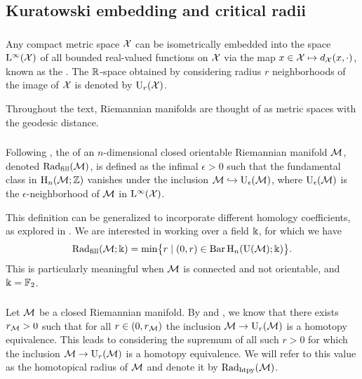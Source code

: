 
\subsection{Kuratowski embedding and critical radii}\label{sub:filling radii}

\subsubsection{}

Any compact metric space \(\cX\) can be isometrically embedded into the space \(\rL^\infty(\cX)\) of all bounded real-valued functions on \(\cX\) via the map \(x \in \cX \mapsto d_\cX(x,\cdot)\), known as the .
The \(\R\)-space obtained by considering radius \(r\) neighborhoods of the image of \(\cX\) is denoted by \(\rU_r(\cX)\).

Throughout the text, Riemannian manifolds are thought of as metric spaces with the geodesic distance.

\subsubsection{}

Following \cite{gromov1983filling}, the  of an \(n\)-dimensional closed orientable Riemannian manifold \(\cM\), denoted \(\fillrad(\cM)\), is defined as the infimal \(\epsilon > 0\) such that the fundamental class in \(\rH_n(\cM; \Z)\) vanishes under the inclusion \(\cM \hookrightarrow \rU_\epsilon(\cM)\), where \(\rU_\epsilon(\cM)\) is the \(\epsilon\)-neighborhood of \(\cM\) in \(\rL^\infty(\cX)\).

This definition can be generalized to incorporate different homology coefficients, as explored in \cite{lim2024vietoris}. 
We are interested in working over a field \(\k\), for which we have
\[
\fillrad(\cM; \field) = \min\set[\big]{r \mid (0, r) \in \barc \rH_n(\rU(\cM); \field)}.
\]
This is particularly meaningful when \(\cM\) is connected and not orientable, and \(\k = \Ftwo\).

\subsubsection{}\label{ss:first_critical_value}

Let \(\cM\) be a closed Riemannian manifold.
By \cite[Thm.~3.5]{hausmann1995vietoris} and \cite[Thm.~4.1]{lim2024vietoris}, we know that there exists \(r_\cM > 0\) such that for all \(r \in (0, r_\cM)\) the inclusion \(\cM \to \rU_{r}(\cM)\) is a homotopy equivalence.
This leads to considering the supremum of all such \(r > 0\) for which the inclusion \(\cM \to \rU_r(\cM)\) is a homotopy
equivalence. 
We will refer to this value as the homotopical radius of $\cM$ and denote it by \(\crit(\mathcal{M})\).

